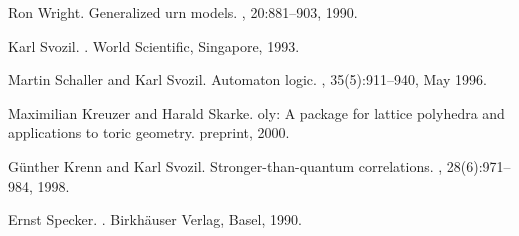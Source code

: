 \begin{thebibliography}{10}
Ron Wright.
\newblock Generalized urn models.
, 20:881--903, 1990.

Karl Svozil.
.
\newblock World Scientific, Singapore, 1993.

Martin Schaller and Karl Svozil.
\newblock Automaton logic.
, 35(5):911--940,
  May 1996.

Maximilian Kreuzer and Harald Skarke.
oly: A package for lattice polyhedra and applications to toric
  geometry.
 preprint, 2000.

G{\"{u}}nther Krenn and Karl Svozil.
\newblock Stronger-than-quantum correlations.
, 28(6):971--984, 1998.

Ernst Specker.
.
\newblock Birkh{\"{a}}user Verlag, Basel, 1990.

\end{thebibliography}


